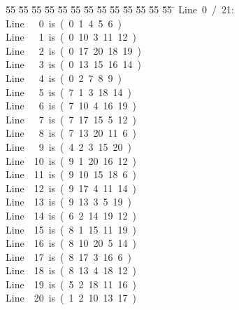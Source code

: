 %
%
\begin{tabbing}
55 \= 55 \= 55 \= 55 \= 55 \= 55 \= 55 \= 55 \= 55 \= 55 \= 55 \= 55 \= 55 \= \kill
Line\ 0\ /\ 21:\\[0pt]
Line\ \ \ 0\ is\ (\ 0\ 1\ 4\ 5\ 6\ )\\[0pt]
Line\ \ \ 1\ is\ (\ 0\ 10\ 3\ 11\ 12\ )\\[0pt]
Line\ \ \ 2\ is\ (\ 0\ 17\ 20\ 18\ 19\ )\\[0pt]
Line\ \ \ 3\ is\ (\ 0\ 13\ 15\ 16\ 14\ )\\[0pt]
Line\ \ \ 4\ is\ (\ 0\ 2\ 7\ 8\ 9\ )\\[0pt]
Line\ \ \ 5\ is\ (\ 7\ 1\ 3\ 18\ 14\ )\\[0pt]
Line\ \ \ 6\ is\ (\ 7\ 10\ 4\ 16\ 19\ )\\[0pt]
Line\ \ \ 7\ is\ (\ 7\ 17\ 15\ 5\ 12\ )\\[0pt]
Line\ \ \ 8\ is\ (\ 7\ 13\ 20\ 11\ 6\ )\\[0pt]
Line\ \ \ 9\ is\ (\ 4\ 2\ 3\ 15\ 20\ )\\[0pt]
Line\ \ 10\ is\ (\ 9\ 1\ 20\ 16\ 12\ )\\[0pt]
Line\ \ 11\ is\ (\ 9\ 10\ 15\ 18\ 6\ )\\[0pt]
Line\ \ 12\ is\ (\ 9\ 17\ 4\ 11\ 14\ )\\[0pt]
Line\ \ 13\ is\ (\ 9\ 13\ 3\ 5\ 19\ )\\[0pt]
Line\ \ 14\ is\ (\ 6\ 2\ 14\ 19\ 12\ )\\[0pt]
Line\ \ 15\ is\ (\ 8\ 1\ 15\ 11\ 19\ )\\[0pt]
Line\ \ 16\ is\ (\ 8\ 10\ 20\ 5\ 14\ )\\[0pt]
Line\ \ 17\ is\ (\ 8\ 17\ 3\ 16\ 6\ )\\[0pt]
Line\ \ 18\ is\ (\ 8\ 13\ 4\ 18\ 12\ )\\[0pt]
Line\ \ 19\ is\ (\ 5\ 2\ 18\ 11\ 16\ )\\[0pt]
Line\ \ 20\ is\ (\ 1\ 2\ 10\ 13\ 17\ )\\[0pt]
\end{tabbing}
